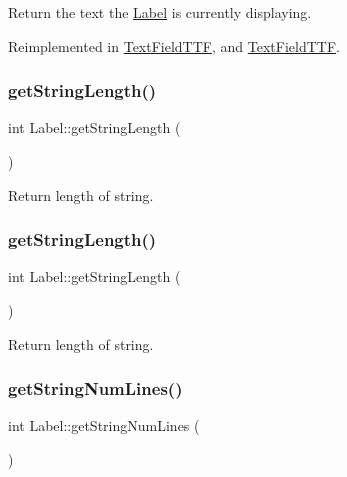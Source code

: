Return the text the \hyperlink{classLabel}{Label} is currently displaying. 

Reimplemented in \hyperlink{classTextFieldTTF_a262a78ec2ef963b2fef8fcde2edc0895}{Text\+Field\+T\+TF}, and \hyperlink{classTextFieldTTF_a078bee267d229540d0940ef7f1413240}{Text\+Field\+T\+TF}.

\mbox{\label{classLabel_ae21ab9e381ac4c9589c31401843e5ca2}} 
\subsubsection{\texorpdfstring{get\+String\+Length()}{getStringLength()}\hspace{0.1cm}{\footnotesize\ttfamily [1/2]}}
{\footnotesize\ttfamily int Label\+::get\+String\+Length (\begin{DoxyParamCaption}{ }\end{DoxyParamCaption})}

Return length of string. \mbox{\label{classLabel_ae21ab9e381ac4c9589c31401843e5ca2}} 
\subsubsection{\texorpdfstring{get\+String\+Length()}{getStringLength()}\hspace{0.1cm}{\footnotesize\ttfamily [2/2]}}
{\footnotesize\ttfamily int Label\+::get\+String\+Length (\begin{DoxyParamCaption}{ }\end{DoxyParamCaption})}

Return length of string. \mbox{\label{classLabel_ab412a9bf4034e5ac27293fe9b44b654a}} 
\subsubsection{\texorpdfstring{get\+String\+Num\+Lines()}{getStringNumLines()}\hspace{0.1cm}{\footnotesize\ttfamily [1/2]}}
{\footnotesize\ttfamily int Label\+::get\+String\+Num\+Lines (\begin{DoxyParamCaption}{ }\end{DoxyParamCaption})}

